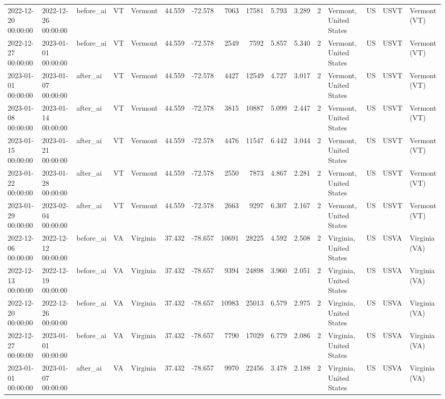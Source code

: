 \begin{tabular}{lllllrrrrrrlllll}
2022-12-20 00:00:00 & 2022-12-26 00:00:00 & before\_ai & VT & Vermont & 44.559 & -72.578 & 7063 & 17581 & 5.793 & 3.289 & 2 & Vermont, United States & US & USVT & Vermont (VT) \\
2022-12-27 00:00:00 & 2023-01-01 00:00:00 & before\_ai & VT & Vermont & 44.559 & -72.578 & 2549 & 7592 & 5.857 & 5.340 & 2 & Vermont, United States & US & USVT & Vermont (VT) \\
2023-01-01 00:00:00 & 2023-01-07 00:00:00 & after\_ai & VT & Vermont & 44.559 & -72.578 & 4427 & 12549 & 4.727 & 3.017 & 2 & Vermont, United States & US & USVT & Vermont (VT) \\
2023-01-08 00:00:00 & 2023-01-14 00:00:00 & after\_ai & VT & Vermont & 44.559 & -72.578 & 3815 & 10887 & 5.099 & 2.447 & 2 & Vermont, United States & US & USVT & Vermont (VT) \\
2023-01-15 00:00:00 & 2023-01-21 00:00:00 & after\_ai & VT & Vermont & 44.559 & -72.578 & 4476 & 11547 & 6.442 & 3.044 & 2 & Vermont, United States & US & USVT & Vermont (VT) \\
2023-01-22 00:00:00 & 2023-01-28 00:00:00 & after\_ai & VT & Vermont & 44.559 & -72.578 & 2550 & 7873 & 4.867 & 2.281 & 2 & Vermont, United States & US & USVT & Vermont (VT) \\
2023-01-29 00:00:00 & 2023-02-04 00:00:00 & after\_ai & VT & Vermont & 44.559 & -72.578 & 2663 & 9297 & 6.307 & 2.167 & 2 & Vermont, United States & US & USVT & Vermont (VT) \\
2022-12-06 00:00:00 & 2022-12-12 00:00:00 & before\_ai & VA & Virginia & 37.432 & -78.657 & 10691 & 28225 & 4.592 & 2.508 & 2 & Virginia, United States & US & USVA & Virginia (VA) \\
2022-12-13 00:00:00 & 2022-12-19 00:00:00 & before\_ai & VA & Virginia & 37.432 & -78.657 & 9394 & 24898 & 3.960 & 2.051 & 2 & Virginia, United States & US & USVA & Virginia (VA) \\
2022-12-20 00:00:00 & 2022-12-26 00:00:00 & before\_ai & VA & Virginia & 37.432 & -78.657 & 10983 & 25013 & 6.579 & 2.975 & 2 & Virginia, United States & US & USVA & Virginia (VA) \\
2022-12-27 00:00:00 & 2023-01-01 00:00:00 & before\_ai & VA & Virginia & 37.432 & -78.657 & 7790 & 17029 & 6.779 & 2.086 & 2 & Virginia, United States & US & USVA & Virginia (VA) \\
2023-01-01 00:00:00 & 2023-01-07 00:00:00 & after\_ai & VA & Virginia & 37.432 & -78.657 & 9970 & 22456 & 3.478 & 2.188 & 2 & Virginia, United States & US & USVA & Virginia (VA) \\

\end{tabular}
